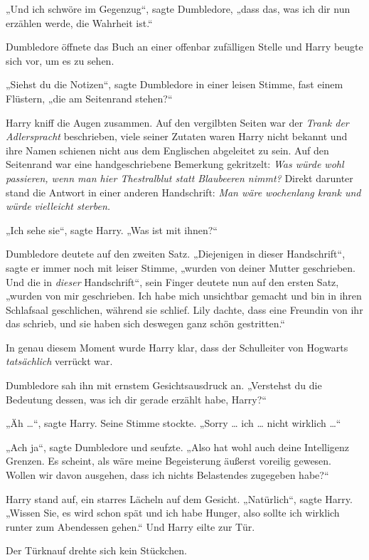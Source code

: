 {„Und ich schwöre im Gegenzug“, sagte Dumbledore, „dass das, was ich dir nun erzählen werde, die Wahrheit ist.“

Dumbledore öffnete das Buch an einer offenbar zufälligen Stelle und Harry beugte sich vor, um es zu sehen.

„Siehst du die Notizen“, sagte Dumbledore in einer leisen Stimme, fast einem Flüstern, „die am Seitenrand stehen?“

Harry kniff die Augen zusammen. Auf den vergilbten Seiten war der \emph{Trank der Adlerspracht} beschrieben, viele seiner Zutaten waren Harry nicht bekannt und ihre Namen schienen nicht aus dem Englischen abgeleitet zu sein. Auf den Seitenrand war eine handgeschriebene Bemerkung gekritzelt: \emph{Was würde wohl passieren, wenn man hier Thestralblut statt Blaubeeren nimmt?} Direkt darunter stand die Antwort in einer anderen Handschrift: \emph{Man wäre wochenlang krank und würde vielleicht sterben.}

„Ich sehe sie“, sagte Harry. „Was ist mit ihnen?“

Dumbledore deutete auf den zweiten Satz. „Diejenigen in dieser Handschrift“, sagte er immer noch mit leiser Stimme, „wurden von deiner Mutter geschrieben. Und die in \emph{dieser} Handschrift“, sein Finger deutete nun auf den ersten Satz, „wurden von mir geschrieben. Ich habe mich unsichtbar gemacht und bin in ihren Schlafsaal geschlichen, während sie schlief. Lily dachte, dass eine Freundin von ihr das schrieb, und sie haben sich deswegen ganz schön gestritten.“

In genau diesem Moment wurde Harry klar, dass der Schulleiter von Hogwarts \emph{tatsächlich} verrückt war.

Dumbledore sah ihn mit ernstem Gesichtsausdruck an. „Verstehst du die Bedeutung dessen, was ich dir gerade erzählt habe, Harry?“

„Äh …“, sagte Harry. Seine Stimme stockte. „Sorry … ich … nicht wirklich …“

„Ach ja“, sagte Dumbledore und seufzte. „Also hat wohl auch deine Intelligenz Grenzen. Es scheint, als wäre meine Begeisterung äußerst voreilig gewesen. Wollen wir davon ausgehen, dass ich nichts Belastendes zugegeben habe?“

Harry stand auf, ein starres Lächeln auf dem Gesicht. „Natürlich“, sagte Harry. „Wissen Sie, es wird schon spät und ich habe Hunger, also sollte ich wirklich runter zum Abendessen gehen.“ Und Harry eilte zur Tür.

Der Türknauf drehte sich kein Stückchen.

}
